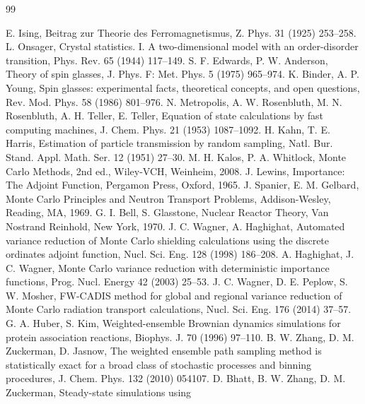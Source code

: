 \documentclass[a4paper,fleqn]{cas-sc}
\begin{document}
\printcredits

\begin{thebibliography}{99}

 E. Ising, Beitrag zur Theorie des Ferromagnetismus, Z. Phys. 31 (1925)
253--258.
 L. Onsager, Crystal statistics. I. A two-dimensional model with an
order-disorder transition, Phys. Rev. 65 (1944) 117--149.
 S. F. Edwards, P. W. Anderson, Theory of spin glasses, J. Phys. F: Met.
Phys. 5 (1975) 965--974.
 K. Binder, A. P. Young, Spin glasses: experimental facts, theoretical
concepts, and open questions, Rev. Mod. Phys. 58 (1986) 801--976.
 N. Metropolis, A. W. Rosenbluth, M. N. Rosenbluth, A. H. Teller,
E. Teller, Equation of state calculations by fast computing machines, J. Chem. Phys. 21 (1953)
1087--1092.
 H. Kahn, T. E. Harris, Estimation of particle transmission by random sampling,
Natl. Bur. Stand. Appl. Math. Ser. 12 (1951) 27--30.
 M. H. Kalos, P. A. Whitlock, Monte Carlo Methods, 2nd ed., Wiley-VCH,
Weinheim, 2008.
 J. Lewins, Importance: The Adjoint Function, Pergamon Press, Oxford, 1965.
 J. Spanier, E. M. Gelbard, Monte Carlo Principles and Neutron Transport
Problems, Addison-Wesley, Reading, MA, 1969.
 G. I. Bell, S. Glasstone, Nuclear Reactor Theory, Van Nostrand Reinhold,
New York, 1970.
 J. C. Wagner, A. Haghighat, Automated variance reduction of Monte Carlo
shielding calculations using the discrete ordinates adjoint function, Nucl. Sci. Eng. 128 (1998)
186--208.
 A. Haghighat, J. C. Wagner, Monte Carlo variance reduction with
deterministic importance functions, Prog. Nucl. Energy 42 (2003) 25--53.
 J. C. Wagner, D. E. Peplow, S. W. Mosher, FW-CADIS method for global and
regional variance reduction of Monte Carlo radiation transport calculations, Nucl. Sci. Eng. 176
(2014) 37--57.
 G. A. Huber, S. Kim, Weighted-ensemble Brownian dynamics simulations for
protein association reactions, Biophys. J. 70 (1996) 97--110.
 B. W. Zhang, D. M. Zuckerman, D. Jasnow, The weighted ensemble path sampling
method is statistically exact for a broad class of stochastic processes and binning procedures,
J. Chem. Phys. 132 (2010) 054107.
 D. Bhatt, B. W. Zhang, D. M. Zuckerman, Steady-state simulations using

\end{thebibliography}
\end{document}

